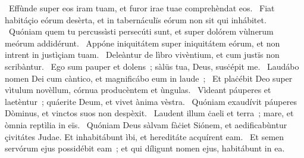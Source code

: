 {~Effùnde super eos iram tuam, et furor irae tuae comprehèndat eos. 
~Fiat habitáçio eórum desèrta, et in tabernáculïs eórum non sit qui inhábitet. 
~Quóniam quem tu percussìsti persecúti sunt, et super dolórem vùlnerum meórum addidérunt. 
~Appóne iniquitátem super iniquitátem eórum, et non intrent in justìçiam tuam. 
~Deleàntur de lìbro vivèntium, et cum justïs non scribàntur. 
~Ego sum pauper et dolens~; sàlüs tua, Deus, susċépit me. 
~Laudábo nomen Dei cum càntico, et magnificábo eum in laude~; 
~Et plaċébit Deo super vìtulum novèllum, córnua producèntem et ùngulas. 
~Vìdeant páuperes et laetèntur~; quáerite Deum, et vivet ànima vèstra. 
~Quóniam exaudívit páuperes Dòminus, et vinctos suos non despèxit. 
~Laudent illum ċaeli et terra~; mare, et òmnia reptìlia in eïs. 
~Quóniam Deus sàlvam fàċiet Siónem, et aedificabùntur çivitátes Judae. Et inhabitábunt ìbi, et hereditáte acquírent eam. 
~Et semen servórum ejus possidébit eam~; et qui díligunt nomen ejus, habitábunt in ea. 
}
